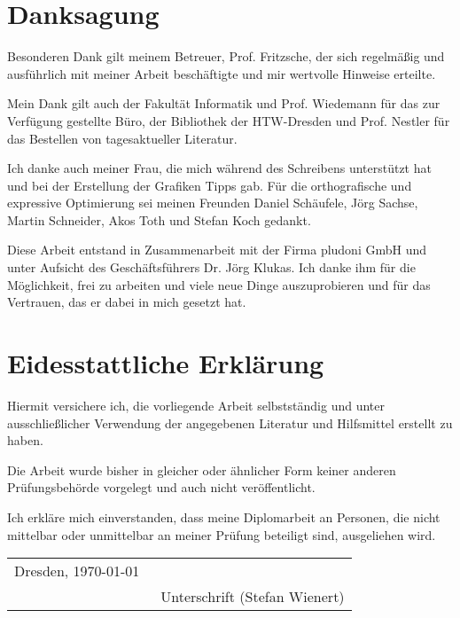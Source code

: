 \tableofcontents		%
\newpage
\chapter*{Danksagung}

Besonderen Dank gilt meinem Betreuer, Prof. Fritzsche, der sich regelmäßig und ausführlich mit meiner Arbeit beschäftigte und mir wertvolle Hinweise erteilte.

Mein Dank gilt auch der Fakultät Informatik und Prof. Wiedemann für das zur Verfügung gestellte Büro, der Bibliothek der HTW-Dresden und Prof. Nestler für das Bestellen von tagesaktueller Literatur.

Ich danke auch meiner Frau, die mich während des Schreibens unterstützt hat und bei der Erstellung der Grafiken Tipps gab. Für die orthografische und expressive Optimierung sei meinen Freunden Daniel Schäufele, Jörg Sachse, Martin Schneider, Akos Toth und Stefan Koch gedankt.

Diese Arbeit entstand in Zusammenarbeit mit der Firma pludoni GmbH und unter Aufsicht des Geschäftsführers Dr. Jörg Klukas. Ich danke ihm für die Möglichkeit, frei zu arbeiten und viele neue Dinge auszuprobieren und für das Vertrauen, das er dabei in mich gesetzt hat.

\newpage
\chapter*{Eidesstattliche Erklärung}
	Hiermit versichere ich, die vorliegende Arbeit selbstständig und unter ausschließlicher Verwendung
	der angegebenen Literatur und Hilfsmittel erstellt zu haben.

	Die Arbeit wurde bisher in gleicher oder ähnlicher Form keiner anderen Prüfungsbehörde vorgelegt
	und auch nicht veröffentlicht.\bigskip

Ich erkläre mich einverstanden, dass meine Diplomarbeit an Personen, die nicht mittelbar oder unmittelbar an meiner Prüfung beteiligt sind, ausgeliehen wird.\bigskip

\begin{tabular}{ll}

	Dresden, \today & \underline{\qquad \qquad \qquad \qquad \qquad \qquad}\\
	& \small{\ Unterschrift (Stefan Wienert)}
\end{tabular}


